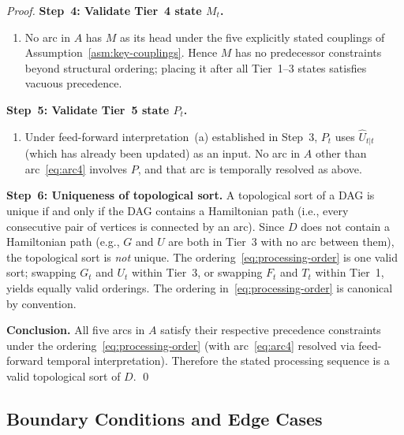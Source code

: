\documentclass[12pt,openany]{book}
\newcommand{\calF}{\mathcal{F}}
\newcommand{\calG}{\mathcal{G}}
\newcommand{\calP}{\mathcal{P}}
\newcommand{\calU}{\mathcal{U}}
\newcommand{\calM}{\mathcal{M}}
\newcommand{\calT}{\mathcal{T}}
\numberwithin{equation}{chapter}
\theoremstyle{plain}
\theoremstyle{definition}
\theoremstyle{remark}
\def\mathcal#1{#1}%
\begin{document}
\begin{proof}
\medskip
\noindent\textbf{Step~4: Validate Tier~4 state $\calM_t$.}
\begin{enumerate}
  \item No arc in $\mathcal{A}$ has $\calM$ as its head
        under the five explicitly stated couplings of
        Assumption~\ref{asm:key-couplings}.  Hence $\calM$
        has no predecessor constraints beyond structural
        ordering; placing it after all Tier~1--3 states
        satisfies vacuous precedence.  \checkmark
\end{enumerate}

\medskip
\noindent\textbf{Step~5: Validate Tier~5 state $\calP_t$.}
\begin{enumerate}
  \item Under feed-forward interpretation~(a) established
        in Step~3, $\calP_t$ uses $\hat{\calU}_{t|t}$
        (which has already been updated) as an input.
        No arc in $\mathcal{A}$ other than arc~\eqref{eq:arc4}
        involves $\calP$, and that arc is temporally
        resolved as above.  \checkmark
\end{enumerate}

\medskip
\noindent\textbf{Step~6: Uniqueness of topological sort.}
A topological sort of a DAG is unique if and only if the DAG
contains a Hamiltonian path (i.e., every consecutive pair of
vertices is connected by an arc).  Since
$\mathcal{D}$ does not contain a Hamiltonian path (e.g.,
$\calG$ and $\calU$ are both in Tier~3 with no arc between
them), the topological sort is \emph{not} unique.  The
ordering~\eqref{eq:processing-order} is one valid sort;
swapping $\calG_t$ and $\calU_t$ within Tier~3, or
swapping $\calF_t$ and $\calT_t$ within Tier~1, yields
equally valid orderings.  The ordering
in~\eqref{eq:processing-order} is canonical by convention.

\medskip
\noindent\textbf{Conclusion.}
All five arcs in $\mathcal{A}$ satisfy their respective
precedence constraints under the
ordering~\eqref{eq:processing-order} (with arc~\eqref{eq:arc4}
resolved via feed-forward temporal interpretation).  Therefore
the stated processing sequence is a valid topological sort of
$\mathcal{D}$.  \qed
\end{proof}

\subsection{Boundary Conditions and Edge Cases}
\end{document}
